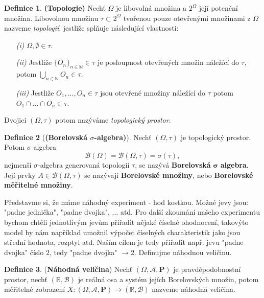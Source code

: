 \documentclass[a4]{report}
\theoremstyle{definition}
\newtheorem{definition}{Definice}[section]
\begin{document}
{\begin{definition}\textbf{(Topologie)}
Nechť $ \Omega $ je libovolná množina a $ 2^{\Omega} $ její potenční množina. Libovolnou množinu $\tau \subset 2^{\Omega} $ tvořenou pouze otevřenými množinami z $\Omega$ nazveme \textit{topologií}, jestliže splňuje následující vlastnosti:
\begin{itemize}
\item[\textit{(i)}] $ \Omega, \emptyset \in \tau $.
\item[\textit{(ii)}] Jestliže $\lbrace O_{n} \rbrace_{n \in \mathbb{N}} \in \tau$ je posloupnost otevřených množin náležící do $ \tau$, potom $\bigcup_{n \in \mathbb{N}}O_{n} \in \tau$.
\item[\textit{(iii)}] Jestliže $O_{1}, ..., O_{n} \in \tau $ jsou otevřené množiny náležící do $\tau$ potom $O_{1}\cap ...\cap O_{n} \in \tau$.
\end{itemize}
Dvojici $(\Omega, \tau)$ potom nazýváme \textit{topologický prostor}.
\end{definition}


\begin{definition}[\textbf{(Borelovská $\sigma$-algebra)}]
Nechť $(\Omega, \tau)$ je topologický prostor. Potom $\sigma$-algebra $$\mathcal{B}(\Omega)=\mathcal{B}(\Omega,\tau) = \sigma(\tau),$$ nejmenší $\sigma$-algebra generovaná topologií $\tau$, se nazývá \textbf{Borelovská} $\bm{\sigma}$ \textbf{algebra}. Její prvky $A \in \mathcal{B}(\Omega, \tau)$ se nazývají \textbf{Borelovské množiny}, nebo \textbf{Borelovské měřitelné množiny}.
\end{definition}

Představme si, že máme náhodný experiment - hod kostkou. Možné jevy jsou: "padne jednička", "padne dvojka", ... atd. Pro další zkoumání našeho experimentu bychom chtěli jednotlivým jevům přiřadit nějaké číselné ohodnocení, takovýto model by nám například umožnil výpočet číselných charakteristik jako jsou střední hodnota, rozptyl atd. Naším cílem je tedy přiřadit např. jevu "padne dvojka" číslo $2$, tedy "padne dvojka" $\longrightarrow 2$. Definujme náhodnou veličinu.
\begin{definition}{(\textbf{Náhodná veličina})}
Nechť $( \Omega, \mathcal{A}, \textbf{P}) $ je pravděpodobnostní prostor, nechť $(\mathbb{R}, \mathcal{B})$ je reálná osa a systém jejích Borelovských množin, potom měřitelné zobrazení $X: (\Omega, \mathcal{A}, \textbf{P}) \longrightarrow (\mathbb{R}, \mathcal{B}) $ nazveme náhodná veličina.
\end{definition}

}
\end{document}

